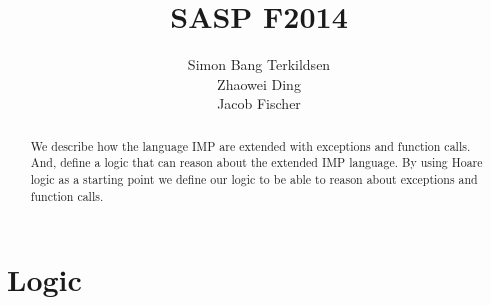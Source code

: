 \documentclass[citeauthoryear]{llncs} %
\title{SASP F2014}
\author{Simon Bang Terkildsen\\Zhaowei Ding\\Jacob Fischer}
\institute{IT University of Copenhagen}
\theoremstyle{definition}
\theoremstyle{notation}
\begin{document}
\maketitle

\begin{abstract}
We describe how the language IMP are extended with exceptions and function calls. And, define a logic that can reason about the extended IMP language. By using Hoare logic as a starting point we define our logic to be able to reason about exceptions and function calls.
\end{abstract}







\section{Logic}








\end{document}
